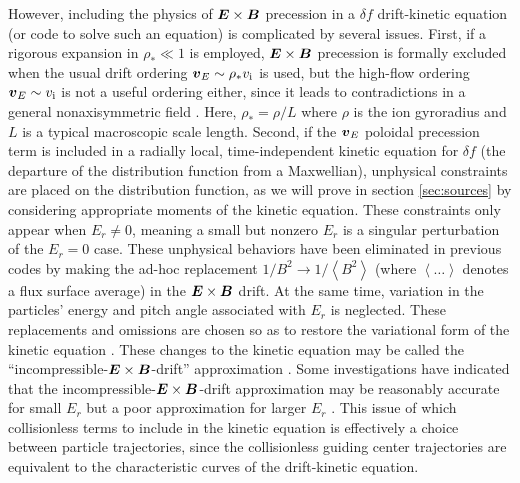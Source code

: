 \documentclass[12pt]{revtex4}
\newcommand{\vect}[1]{\mbox{\boldmath $#1$}}
\newcommand{\vi}{v_{\mathrm{i}}}
\begin{document}
However, including the physics of $\vect{E}\times\vect{B}$ precession in a $\delta\! f$ drift-kinetic equation (or code to
solve such an equation)
is complicated by several issues.
First, if a rigorous expansion in $\rho_* \ll 1$ is employed, 
$\vect{E}\times\vect{B}$ precession is formally excluded
when the usual drift ordering $\vect{v}_E \sim \rho_* \vi$ is used,
but the high-flow ordering $\vect{v}_E \sim \vi$ is
not a useful ordering either, since it leads to contradictions in a general nonaxisymmetric field \cite{HelanderRotation, SugamaHighFlow}.
Here, $\rho_* = \rho/L$ where $\rho$ is the ion gyroradius and $L$ is a typical
macroscopic scale length.
Second, if the $\vect{v}_{E}$ poloidal precession term
is included in a radially local, time-independent kinetic equation
for $\delta\! f$ (the departure of the distribution function from a Maxwellian),
unphysical constraints are placed on the distribution function,
as we will prove in section \ref{sec:sources}
by considering appropriate moments of the kinetic equation.
These constraints only appear when $E_r \ne 0$, meaning a small but nonzero
$E_r$ is a singular perturbation of the $E_r=0$ case.
These unphysical behaviors have been eliminated in previous codes\cite{BeidlerBigBenchmarking}
by making the ad-hoc replacement $1/B^2 \to 1/\left< B^2 \right>$ (where $\left< \ldots \right>$ denotes
a flux surface average) in the $\vect{E}\times\vect{B}$ drift.
At the same time, variation in the particles' energy and pitch angle associated with $E_r$ is neglected.
These replacements and omissions are chosen so as to restore the variational form of the kinetic equation  \cite{DKES1, DKES2}.
These changes to the kinetic equation may be called the ``incompressible-$\vect{E}\times\vect{B}$-drift''
approximation \cite{Beidler}.
Some investigations have indicated that the incompressible-$\vect{E}\times\vect{B}$-drift
approximation may be reasonably accurate for small $E_r$ but a poor approximation
for larger $E_r$ \cite{Beidler, meMonoenergetic}.
This issue of which collisionless terms to include in the kinetic equation
is effectively a choice between particle trajectories, since the collisionless guiding center trajectories
are equivalent to the characteristic curves of the drift-kinetic equation.
\end{document}
